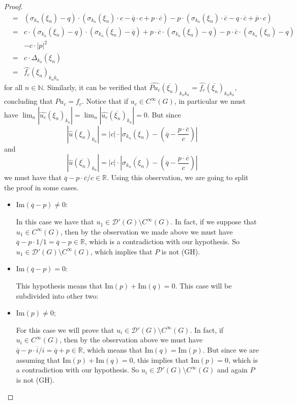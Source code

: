\documentclass[10pt,a4paper]{amsart}
\renewcommand{\Im}{\textrm{Im}}
\begin{document}
\begin{proof}
\begin{eqnarray*}
	& = & (\sigma_{k_n}(\xi_n)-q) \cdot (\sigma_{k_n}(\xi_n)\cdot c-\overline{q}\cdot c +p\cdot \overline{c})-p \cdot (\sigma_{k_n}(\xi_n)\cdot \overline{c}-q \cdot \overline{c}+\overline{p}\cdot c) \\
	& = & c\cdot (\sigma_{k_n}(\xi_n)-q)\cdot (\sigma_{k_n}(\xi_n)-\overline{q})+p \cdot \overline{c}\cdot (\sigma_{k_n}(\xi_n)-q)- p \cdot \overline{c} \cdot(\sigma_{k_n}(\xi_n)-q) \\ 
	&   & -c \cdot |p|^2 \\
	& = & c \cdot \Delta_{k_n}(\xi_n) \\
	& = & \widehat{f_c}(\xi_n)_{k_n k_n}
\end{eqnarray*} 
for all $n \in \mathbb{N}$. Similarly, it can be verified that $\widehat{Pu_c}(\overline{\xi_n})_{k_n k_n}=\widehat{f_c}(\overline{\xi_n})_{k_n k_n}$, concluding that $Pu_c=f_c$. 
Notice that if $u_c \in C^\infty(G)$, in particular we must have $\lim_n |\widehat{u_c}(\xi_n)_{k_n}| = \lim_n |\widehat{u_c}(\overline{\xi_n})_{k_n}|=0$. But since
$$|\widehat{u}(\xi_n)_{k_n}| = |c| \cdot \left|\sigma_{k_n}(\xi_n)-\left(\overline{q}-\frac{p \cdot \overline{c}}{c}\right) \right| $$
and
$$|\widehat{u}(\overline{\xi_n})_{k_n}| = |c| \cdot \left|\overline{\sigma_{k_n}(\xi_n)}-\left(\overline{q}-\frac{p \cdot \overline{c}}{c}\right) \right| $$
we must have that $\overline{q}-p \cdot \overline{c}/c \in \mathbb{R}$. Using this observation, we are going to split the proof in some cases.

\begin{itemize} 
	
\item[1)] $\Im(\overline{q}-p) \neq 0$:

In this case we have that $u_1 \in \mathcal{D}'(G) \setminus C^\infty(G)$. In fact, if we suppose that $u_1 \in C^\infty(G)$, then by the observation we made above we must have $\overline{q}-p\cdot 1/1=\overline{q}-p \in \mathbb{R}$, which is a contradiction with our hypothesis. So $u_1 \in \mathcal{D}'(G) \setminus C^\infty(G)$, which implies that $P$ is not (GH).

\item[2)] $\Im(\overline{q}-p) = 0$:

This hypothesis means that $\Im(p)+\Im(q)=0$. This case will be subdivided into other two:

\item[2.1)] $\Im(p) \neq 0$;

For this case we will prove that $u_i \in \mathcal{D}'(G)\setminus C^\infty(G)$. In fact, if $u_i \in C^\infty(G)$, then by the observation above we must have $\overline{q}-p \cdot \overline{i}/i=\overline{q}+p \in \mathbb{R}$, which means that $\Im(q)=\Im(p)$. But since we are assuming that $\Im(p)+\Im(q)=0$, this implies that $\Im(p) =0$, which is a contradiction with our hypothesis. So $u_i \in \mathcal{D}'(G)\setminus C^\infty(G)$ and again $P$ is not (GH).


\end{itemize}
\end{proof}
\end{document}

